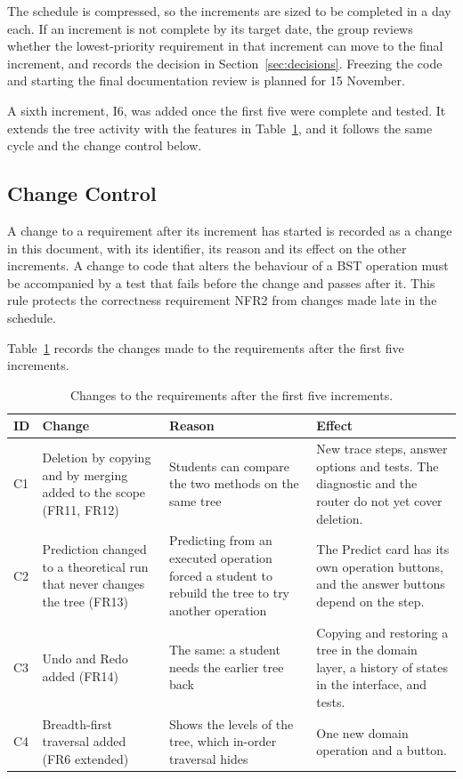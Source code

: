 The schedule is compressed, so the increments are sized to be completed in a day each. If an increment is not complete by its target date, the group reviews whether the lowest-priority requirement in that increment can move to the final increment, and records the decision in Section~\ref{sec:decisions}. Freezing the code and starting the final documentation review is planned for 15 November.

A sixth increment, I6, was added once the first five were complete and tested. It extends the tree activity with the features in Table~\ref{tab:changes}, and it follows the same cycle and the change control below.

\subsection{Change Control}
A change to a requirement after its increment has started is recorded as a change in this document, with its identifier, its reason and its effect on the other increments. A change to code that alters the behaviour of a BST operation must be accompanied by a test that fails before the change and passes after it. This rule protects the correctness requirement NFR2 from changes made late in the schedule.

Table~\ref{tab:changes} records the changes made to the requirements after the first five increments.

\begin{table}[H]
\centering
\small
\caption{Changes to the requirements after the first five increments.}
\label{tab:changes}
\begin{tabularx}{\textwidth}{p{1cm} p{4cm} p{4.4cm} X}
\toprule
ID & Change & Reason & Effect \\
\midrule
C1 & Deletion by copying and by merging added to the scope (FR11, FR12) & Students can compare the two methods on the same tree & New trace steps, answer options and tests. The diagnostic and the router do not yet cover deletion. \\
C2 & Prediction changed to a theoretical run that never changes the tree (FR13) & Predicting from an executed operation forced a student to rebuild the tree to try another operation & The Predict card has its own operation buttons, and the answer buttons depend on the step. \\
C3 & Undo and Redo added (FR14) & The same: a student needs the earlier tree back & Copying and restoring a tree in the domain layer, a history of states in the interface, and tests. \\
C4 & Breadth-first traversal added (FR6 extended) & Shows the levels of the tree, which in-order traversal hides & One new domain operation and a button. \\
\bottomrule
\end{tabularx}
\end{table}